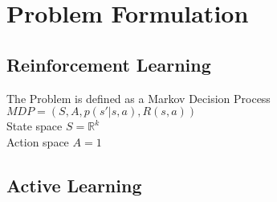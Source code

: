 \documentclass[11pt]{article}
\begin{document}
\section{Problem Formulation}
    \subsection{Reinforcement Learning}
        The Problem is defined as a Markov Decision Process \\
        $MDP = (S, A, p(s' | s, a), R(s, a))$ \\[1mm]
        State space $S = \mathbb{R}^k$ \\[1mm]
        Action space $A = \text{1}$ \\[1mm]


    \subsection{Active Learning}
\end{document}
